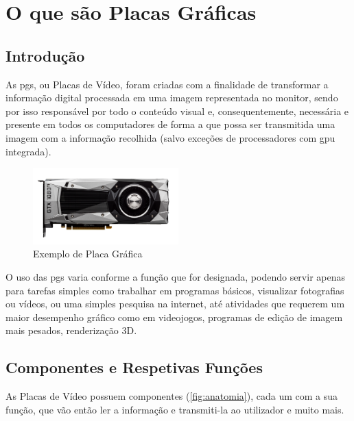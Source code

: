 \documentclass{report}
\begin{document}
\tableofcontents
\listoftables     %
\listoffigures    %


\clearpage
{}

\chapter{O que são Placas Gráficas}
\label{gpu}
\section{Introdução}
\label{introduc}

As \acp{pg}, ou Placas de Vídeo, foram criadas com a finalidade de transformar a informação digital processada em uma imagem representada no monitor, sendo por isso responsável por todo o conteúdo visual e, consequentemente, necessária e presente em todos os computadores de forma a que possa ser transmitida uma imagem com a informação recolhida (salvo exceções de processadores com \ac{gpu} integrada).


\begin{figure}[h]
\centering
\includegraphics[width=0.5\textwidth]{1080ti.png}
\caption{Exemplo de Placa Gráfica}
\label{fig:1080ti}
\end{figure}

O uso das \acp{pg} varia conforme a função que for designada, podendo servir apenas para tarefas simples como trabalhar em programas básicos, visualizar fotografias ou vídeos, ou uma simples pesquisa na internet, até atividades que requerem um maior desempenho gráfico como em videojogos, programas de edição de imagem mais pesados, renderização 3D.
\clearpage
\section{Componentes e Respetivas Funções}
\label{comp}

As Placas de Vídeo possuem componentes (\autoref{fig:anatomia}), cada um com a sua função, que vão então ler a informação e transmiti-la ao utilizador e muito mais.
\end{document}

